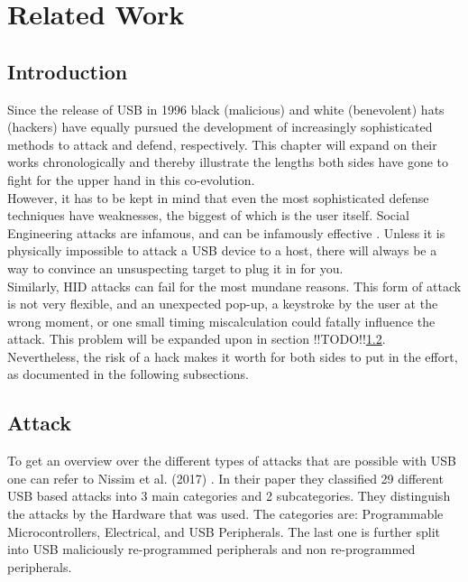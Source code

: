 \chapter{Related Work}

\section{Introduction}

Since the release of USB in 1996 \cite{WaybackMachine2018} black (malicious) and white (benevolent) hats (hackers) have equally pursued the development of increasingly sophisticated methods to attack and defend, respectively. This chapter will expand on their works chronologically and thereby illustrate the lengths both sides have gone to fight for the upper hand in this co-evolution.\\
However, it has to be kept in mind that even the most sophisticated defense techniques have weaknesses, the biggest of which is the user itself. Social Engineering attacks are infamous, and can be infamously effective \cite{krombholzAdvancedSocialEngineering2015}. Unless it is physically impossible to attack a USB device to a host, there will always be a way to convince an unsuspecting target to plug it in for you.\\ 
Similarly, HID attacks can fail for the most mundane reasons. This form of attack is not very flexible, and an unexpected pop-up, a keystroke by the user at the wrong moment, or one small timing miscalculation could fatally influence the attack. This problem will be expanded upon in section !!TODO!!\ref{}.\\
Nevertheless, the risk of a hack makes it worth for both sides to put in the effort, as documented in the following subsections.

\section{Attack}

To get an overview over the different types of attacks that are possible with USB one can refer to Nissim et al. (2017) \cite{nissimUSBbasedAttacks2017}. In their paper they classified 29 different USB based attacks into 3 main categories and 2 subcategories. They distinguish the attacks by the Hardware that was used. The categories are: Programmable Microcontrollers, Electrical, and USB Peripherals. The last one is further split into USB maliciously re-programmed peripherals and non re-programmed peripherals. 

